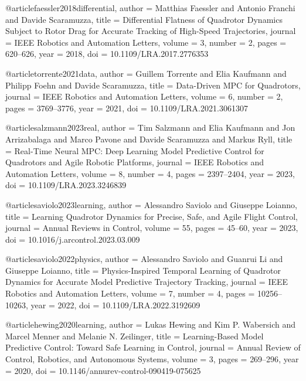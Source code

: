 \documentclass[conference]{IEEEtran}
\begin{document}




@article{faessler2018differential,
  author    = {Matthias Faessler and Antonio Franchi and Davide Scaramuzza},
  title     = {Differential Flatness of Quadrotor Dynamics Subject to Rotor Drag for Accurate Tracking of High-Speed Trajectories},
  journal   = {IEEE Robotics and Automation Letters},
  volume    = {3},
  number    = {2},
  pages     = {620--626},
  year      = {2018},
  doi       = {10.1109/LRA.2017.2776353}
}

@article{torrente2021data,
  author    = {Guillem Torrente and Elia Kaufmann and Philipp Foehn and Davide Scaramuzza},
  title     = {Data-Driven MPC for Quadrotors},
  journal   = {IEEE Robotics and Automation Letters},
  volume    = {6},
  number    = {2},
  pages     = {3769--3776},
  year      = {2021},
  doi       = {10.1109/LRA.2021.3061307}
}

@article{salzmann2023real,
  author    = {Tim Salzmann and Elia Kaufmann and Jon Arrizabalaga and Marco Pavone and Davide Scaramuzza and Markus Ryll},
  title     = {Real-Time Neural {MPC}: Deep Learning Model Predictive Control for Quadrotors and Agile Robotic Platforms},
  journal   = {IEEE Robotics and Automation Letters},
  volume    = {8},
  number    = {4},
  pages     = {2397--2404},
  year      = {2023},
  doi       = {10.1109/LRA.2023.3246839}
}

@article{saviolo2023learning,
  author    = {Alessandro Saviolo and Giuseppe Loianno},
  title     = {Learning Quadrotor Dynamics for Precise, Safe, and Agile Flight Control},
  journal   = {Annual Reviews in Control},
  volume    = {55},
  pages     = {45--60},
  year      = {2023},
  doi       = {10.1016/j.arcontrol.2023.03.009}
}

@article{saviolo2022physics,
  author    = {Alessandro Saviolo and Guanrui Li and Giuseppe Loianno},
  title     = {Physics-Inspired Temporal Learning of Quadrotor Dynamics for Accurate Model Predictive Trajectory Tracking},
  journal   = {IEEE Robotics and Automation Letters},
  volume    = {7},
  number    = {4},
  pages     = {10256--10263},
  year      = {2022},
  doi       = {10.1109/LRA.2022.3192609}
}

@article{hewing2020learning,
  author    = {Lukas Hewing and Kim P. Wabersich and Marcel Menner and Melanie N. Zeilinger},
  title     = {Learning-Based Model Predictive Control: Toward Safe Learning in Control},
  journal   = {Annual Review of Control, Robotics, and Autonomous Systems},
  volume    = {3},
  pages     = {269--296},
  year      = {2020},
  doi       = {10.1146/annurev-control-090419-075625}
}
\end{document}
